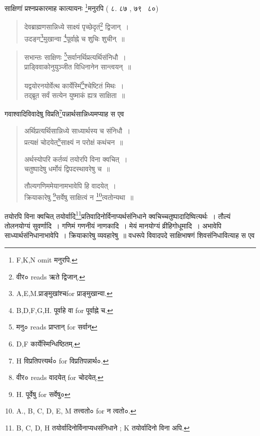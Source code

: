 \documentclass[11pt, openany]{book}
\begin{document}
साक्षिणां प्रश्नप्रकारमाह कात्यायनः \renewcommand{\thefootnote}{9}\footnote{F,K,N omit मनुरपि.}मनुरपि ( ८. ८७ , ७९ \textendash\ ८०)

\begin{quote}
{\vy देवब्राह्मणसान्निध्ये साक्ष्यं पृच्छेदृतं\renewcommand{\thefootnote}{10}\footnote{वीर० reads ऋते द्विजान्.} द्विजान्~।\\
उदङ्ग\renewcommand{\thefootnote}{11}\footnote{A,E,M.प्राङ्मुखांश्चfor प्राङ्मुखान्वा.}मुखान्वा \renewcommand{\thefootnote}{12}\footnote{B,D,F,G,H. पूर्वाहे वा for पूर्वाह्ने च.}पूर्वाह्ने च शुचिः शुचीन्~॥}
\end{quote}

\newpage
{}

\begin{quote}
{\vy सभान्तः साक्षिणः \renewcommand{\thefootnote}{1}\footnote{मनु० reads प्राप्तान् for सर्वान्}सर्वानर्थिप्रत्यर्थिसंनिधौ~।\\
प्राड्विवाकोनुयुञ्जीत विधिनानेन सान्त्वयन्~॥

यद्वयोरनयोर्वेत्थ कार्येस्मिं\renewcommand{\thefootnote}{2}\footnote{D,F कार्येस्मिन्धिष्ठितम्.}श्चेष्टितं मिथः~।\\
तद्ब्रूत सर्वं सत्येन युष्माकं ह्यत्र साक्षिता~॥}
\end{quote}

गवाश्वादिविवादेषु विप्रति\renewcommand{\thefootnote}{3}\footnote{H विप्रतिपत्त्यर्थ० for विप्रतिपन्नार्थ०.}पन्नार्थसान्निध्यमप्याह स एव 

\begin{quote}
{\vy अर्थिप्रत्यर्थिसान्निध्ये साध्यार्थस्य च संनिधौ~।\\
प्रत्यक्षं चोदयेत्\renewcommand{\thefootnote}{4}\footnote{वीर० reads वादयेत् for चोदयेत्.}साक्ष्यं न परोक्षं कथंचन~॥

अर्थस्योपरि कर्तव्यं तयोरपि विना क्वचित्~।\\
चतुष्पादेषु धर्मोयं द्विपदस्थावरेषु च~॥

तौल्यगणिममेयानामभावेपि हि वादयेत्~।\\
क्रियाकारेषु \renewcommand{\thefootnote}{5}\footnote{H. पूर्वेषु for सर्वेषु०}सर्वेषु साक्षित्वं न \renewcommand{\thefootnote}{6}\footnote{A., B, C, D, E, M तत्त्वतो० for न त्वतो०.}त्वतोन्यथा~॥}
\end{quote}

तयोरपि विना क्वचित् तयोर्वादि\renewcommand{\thefootnote}{7}\footnote{B, C, D, H तयोर्वादिनोर्विनाप्यधसंनिधाने ; K तयोर्वादिनो विना अपि.}प्रतिवादिनोर्विनाप्यर्थसंनिधाने क्वचिच्चतुष्पादादिष्वित्यर्थः~। तौल्यं तोलनयोग्यं सुवर्णादि~। गणिमं गणनीयं नाणकादि~। मेयं मानयोग्यं व्रीहिगोधूमादि~। अभावेपि साध्यार्थसंनिधानाभावेपि~। क्रियाकारेषु व्यवहारेषु~॥ वधरूपे विवादपदे साक्षिभाषणं शिवसंनिधावित्याह स एव
\end{document}
